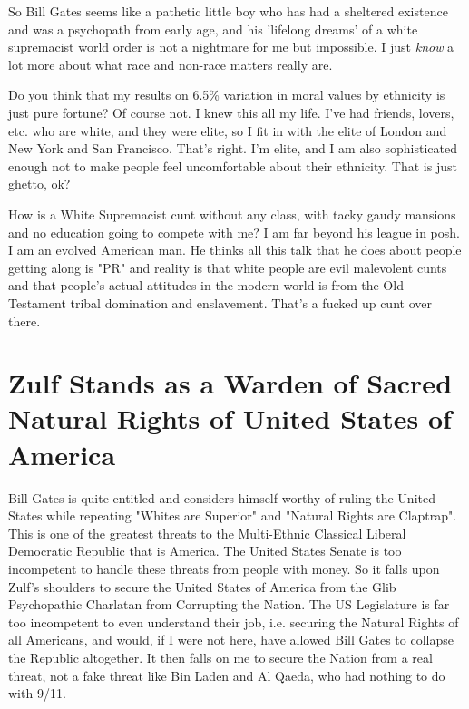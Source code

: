 \documentclass{amsart}
\begin{document}
So Bill Gates seems like a pathetic little boy who has had a sheltered existence and was a psychopath from early age, and his 'lifelong dreams' of a white supremacist world order is not a nightmare for me but impossible.  I just {\em know} a lot more about what race and non-race matters really are. 

Do you think that my results on 6.5\% variation in moral values by ethnicity is just pure fortune?  Of course not.  I knew this all my life.  I've had friends, lovers, etc. who are white, and they were elite, so I fit in with the elite of London and New York and San Francisco.  That's right. I'm elite, and I am also sophisticated enough not to make people feel uncomfortable about their ethnicity.  That is just ghetto, ok?

How is a White Supremacist cunt without any class, with tacky gaudy mansions and no education going to compete with me?  I am far beyond his league in posh.  I am an evolved American man.  He thinks all this talk that he does about people getting along is "PR" and reality is that white people are evil malevolent cunts and that people's actual attitudes in the modern world is from the Old Testament tribal domination and enslavement.  That's a fucked up cunt over there.  

\section{Zulf Stands as a Warden of Sacred Natural Rights of United States of America}

Bill Gates is quite entitled and considers himself worthy of ruling the United States while repeating "Whites are Superior" and "Natural Rights are Claptrap".  This is one of the greatest threats to the Multi-Ethnic Classical Liberal Democratic Republic that is America.  The United States Senate is too incompetent to handle these threats from people with money.  So it falls upon Zulf's shoulders to secure the United States of America from the Glib Psychopathic Charlatan from Corrupting the Nation.  The US Legislature is far too incompetent to even understand their job, i.e. securing the Natural Rights of all Americans, and would, if I were not here, have allowed Bill Gates to collapse the Republic altogether.  It then falls on me to secure the Nation from a real threat, not a fake threat like Bin Laden and Al Qaeda, who had nothing to do with 9/11.
\end{document}
